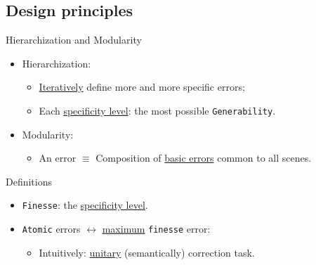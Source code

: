 \documentclass[10pt]{beamer}
\begin{document}
        \subsection{Design principles}
            \begin{frame}{Hierarchization and Modularity}
                \begin{itemize}[label=\(\blacktriangleright\), font=\color{IGNGreen}, itemsep=2em]
                    \item<1-> Hierarchization:
                        \begin{itemize}[label=\(\blacktriangleright\), font=\color{IGNGreen}, itemsep=2em]
                            \item<2-> \underline{Iteratively} define more and more specific errors;
                            \item<3-> Each \underline{specificity level}: the most possible \texttt{Generability}.
                        \end{itemize}
                    \item<4-> Modularity:
                        \begin{itemize}[label=\(\blacktriangleright\), font=\color{IGNGreen}, itemsep=2em]
                            \item<5-> An error \(\equiv\) Composition of \underline{basic errors} common to all scenes.
                        \end{itemize}
                \end{itemize}
            \end{frame}

            \begin{frame}{Definitions}
                \begin{itemize}[label=\(\blacktriangleright\), font=\color{IGNGreen}, itemsep=2em]
                    \item<1-> \texttt{Finesse}: the \underline{specificity level}.
                    \item<2-> \texttt{Atomic} errors \(\leftrightarrow\) \underline{maximum} \texttt{finesse} error:
                        \begin{itemize}
                            \item<3-> Intuitively: \underline{unitary} (semantically) correction task.
                        \end{itemize}
                \end{itemize}
            \end{frame}
        
\end{document}

